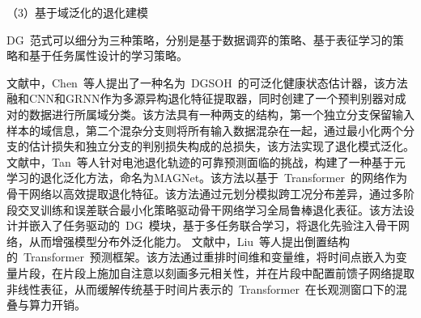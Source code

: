 （3）{基于域泛化的退化建模}

DG~范式可以细分为三种策略，分别是基于数据调弈的策略、基于表征学习的策略和基于任务属性设计的学习策略\cite{9782500}。

文献\cite{CHEN2024234696}中，Chen~等人提出了一种名为~DGSOH~的可泛化健康状态估计器，该方法融和CNN和GRNN作为多源异构退化特征提取器，同时创建了一个预判别器对成对的数据进行所属域分类。该方法具有一种两支的结构，第一个独立分支保留输入样本的域信息，第二个混杂分支则将所有输入数据混杂在一起，通过最小化两个分支的估计损失和独立分支的判别损失构成的总损失，该方法实现了退化模式泛化。
文献\cite{TAN2024103725}中，Tan~等人针对电池退化轨迹的可靠预测面临的挑战，构建了一种基于元学习的退化泛化方法，命名为MAGNet。该方法以基于~Transformer~的网络作为骨干网络以高效提取退化特征。该方法通过元划分模拟跨工况分布差异，通过多阶段交叉训练和误差联合最小化策略驱动骨干网络学习全局鲁棒退化表征。该方法设计并嵌入了任务驱动的~DG~模块，基于多任务联合学习，将退化先验注入骨干网络，从而增强模型分布外泛化能力。
文献\cite{liu2024itransformer}中，Liu~等人提出倒置结构的~Transformer~预测框架。该方法通过重排时间维和变量维，将时间点嵌入为变量片段，在片段上施加自注意以刻画多元相关性，并在片段中配置前馈子网络提取非线性表征，从而缓解传统基于时间片表示的~Transformer~在长观测窗口下的混叠与算力开销。
